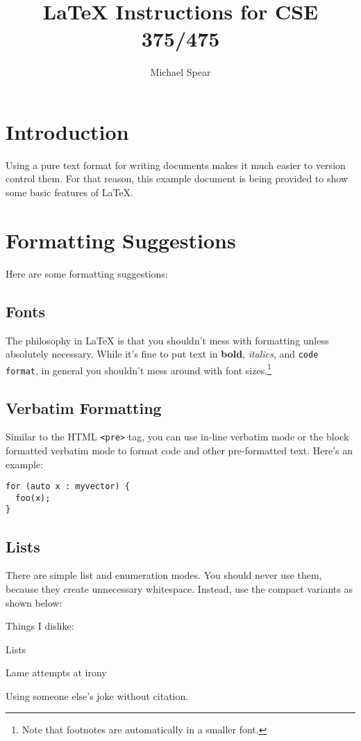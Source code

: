 \documentclass[10pt, letterpaper]{article}
\title{LaTeX Instructions for CSE 375/475}
\author{Michael Spear}
\date{} %
\begin{document}
\maketitle

\section{Introduction}
Using a pure text format for writing documents makes it much easier to
version control them.  For that reason, this example document is being
provided to show some basic features of LaTeX.

\section{Formatting Suggestions}
\label{sec-formatting}
Here are some formatting suggestions:

\subsection{Fonts}
\label{sec-fonts}
The philosophy in LaTeX is that you shouldn't mess with formatting unless
absolutely necessary.  While it's fine to put text in \textbf{bold},
\textit{italics}, and \texttt{code format}, in general you shouldn't mess
around with font sizes.\footnote{Note that footnotes are automatically in a
  smaller font.}

\subsection{Verbatim Formatting}
\label{sec-verb}
Similar to the HTML \verb|<pre>| tag, you can use in-line verbatim mode or
the block formatted verbatim mode to format code and other pre-formatted
text.  Here's an example:

\begin{verbatim}
for (auto x : myvector) {
  foo(x);
}
\end{verbatim}

\subsection{Lists}
There are simple list and enumeration modes.  You should never use them,
because they create unnecessary whitespace.  Instead, use the compact
variants as shown below:

Things I dislike:
\begin{compactitem}
\item Lists
\item Lame attempts at irony
\item Using someone else's joke without citation.
\end{compactitem}
\end{document}
